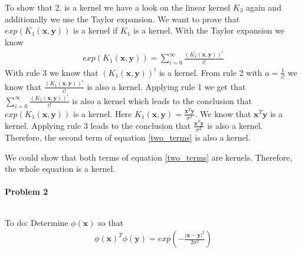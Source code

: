 \documentclass{article}
\renewcommand{\Vec}[1]{\ensuremath{\mathbf{#1}}}
\begin{document}
To show that 2. is a kernel we have a look on the linear kernel $K_3$ again and additionally we use the Taylor expansion. We want to prove that $exp(K_1(\Vec{x}, \Vec{y}))$ is a kernel if $K_1$ is a kernel. With the Taylor expansion we know
\begin{eqnarray}
exp(K_1(\Vec{x}, \Vec{y})) = \sum_{i = 0}^{\infty} \frac{(K_1(\Vec{x}, \Vec{y}))^i}{i!}
\end{eqnarray}
With rule 3 we know that $(K_1(\Vec{x}, \Vec{y}))^i$ is a kernel. From rule 2 with $a = \frac{1}{i!}$ we know that $\frac{(K_1(\Vec{x}, \Vec{y}))^i}{i!}$ is also a kernel. Applying rule 1 we get that $\sum_{i = 0}^{\infty} \frac{(K_1(\Vec{x}, \Vec{y}))^i}{i!}$ is also a kernel which leads to the conclusion that $exp(K_1(\Vec{x}, \Vec{y}))$ is a kernel. Here $K_1(\Vec{x}, \Vec{y}) = \frac{\Vec{x}^T\Vec{y}}{\sigma^2}$. We know that $\Vec{x}^T\Vec{y}$ is a kernel. Applying rule 3 leads to the conclusion that $\frac{\Vec{x}^T\Vec{y}}{\sigma^2}$ is also a kernel. Therefore, the second term of equation \ref{two_terms} is also a kernel.

We could show that both terms of equation \ref{two_terms} are kernels. Therefore, the whole equation is a kernel.


\paragraph*{Problem 2}
$\;$ 

To do: Determine $\phi(\Vec{x})$ so that
\begin{eqnarray}
\phi(\Vec{x})^T\phi(\Vec{y}) = exp(-\frac{|\Vec{x}-\Vec{y}|^2}{2 \sigma^2})
\end{eqnarray}
\end{document}
